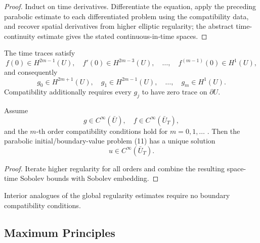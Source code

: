 \begin{proof}
\sketch Induct on time derivatives. Differentiate the equation, apply the preceding parabolic estimate to each differentiated problem using the compatibility data, and recover spatial derivatives from higher elliptic regularity; the abstract time-continuity estimate gives the stated continuous-in-time spaces.
\end{proof}

\begin{remark}
\label{rem:parabolic-compatibility-conditions}

The time traces satisfy
\[
f(0)\in H^{2m-1}(U),\quad f'(0)\in H^{2m-3}(U),\quad\ldots,\quad f^{(m-1)}(0)\in H^1(U),
\]
and consequently
\[
g_0\in H^{2m+1}(U),\quad g_1\in H^{2m-1}(U),\quad\ldots,\quad g_m\in H^1(U).
\]
Compatibility additionally requires every $g_j$ to have zero trace on $\partial U$.
\end{remark}

\begin{theorem}
\label{thm:parabolic-infinite-differentiability}

Assume
\[
g \in C^\infty(\bar{U}), \quad f \in C^\infty(\bar{U}_T),
\]
and the $m$-th order compatibility conditions hold for $m = 0, 1, \ldots$ . Then the parabolic initial/boundary-value problem (11) has a unique solution
\[
u \in C^\infty(\bar{U}_T).
\]
\end{theorem}

\begin{proof}
\sketch Iterate higher regularity for all orders and combine the resulting space-time Sobolev bounds with Sobolev embedding.
\end{proof}

\begin{remark}
\label{rem:parabolic-interior-estimates}

Interior analogues of the global regularity estimates require no boundary compatibility conditions.
\end{remark}

\subsection{Maximum Principles}

